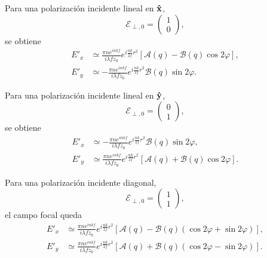 Para una polarización incidente lineal en $\bm{\hat{\mathbf{x}}}$,
\begin{equation}
\mathscr E_{\perp,0}
=
\begin{pmatrix}
1\\
0
\end{pmatrix},
\end{equation}
se obtiene
\begin{equation}
\begin{aligned}
E'_x
&\simeq
\frac{\pi n e^{inkf}}{i\lambda f z_0}
e^{i\frac{nk}{2f}r^2}
\left[
\mathcal A(q)
-
\mathcal B(q)\cos2\varphi
\right],
\\
E'_y
&\simeq
-
\frac{\pi n e^{inkf}}{i\lambda f z_0}
e^{i\frac{nk}{2f}r^2}
\mathcal B(q)\sin2\varphi.
\end{aligned}
\label{eq:cartesian_case_10}
\end{equation}

Para una polarización incidente lineal en $\bm{\hat{\mathbf{y}}}$,
\begin{equation}
\mathscr E_{\perp,0}
=
\begin{pmatrix}
0\\
1
\end{pmatrix},
\end{equation}
se obtiene
\begin{equation}
\begin{aligned}
E'_x
&\simeq
-
\frac{\pi n e^{inkf}}{i\lambda f z_0}
e^{i\frac{nk}{2f}r^2}
\mathcal B(q)\sin2\varphi,
\\
E'_y
&\simeq
\frac{\pi n e^{inkf}}{i\lambda f z_0}
e^{i\frac{nk}{2f}r^2}
\left[
\mathcal A(q)
+
\mathcal B(q)\cos2\varphi
\right].
\end{aligned}
\label{eq:cartesian_case_01}
\end{equation}

Para una polarización incidente diagonal,
\begin{equation}
\mathscr E_{\perp,0}
=
\begin{pmatrix}
1\\
1
\end{pmatrix},
\end{equation}
el campo focal queda
\begin{equation}
\begin{aligned}
E'_x
&\simeq
\frac{\pi n e^{inkf}}{i\lambda f z_0}
e^{i\frac{nk}{2f}r^2}
\left[
\mathcal A(q)
-
\mathcal B(q)
\left(
\cos2\varphi+\sin2\varphi
\right)
\right],
\\
E'_y
&\simeq
\frac{\pi n e^{inkf}}{i\lambda f z_0}
e^{i\frac{nk}{2f}r^2}
\left[
\mathcal A(q)
+
\mathcal B(q)
\left(
\cos2\varphi-\sin2\varphi
\right)
\right].
\end{aligned}
\label{eq:cartesian_case_11}
\end{equation}

